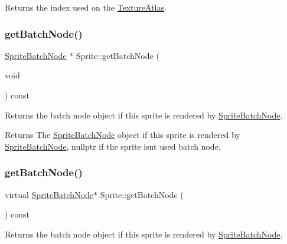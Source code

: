 Returns the index used on the \hyperlink{classTextureAtlas}{Texture\+Atlas}. \mbox{\label{classSprite_a1eb6a1e8196f526077a4435fee295e53}} 
\subsubsection{\texorpdfstring{get\+Batch\+Node()}{getBatchNode()}\hspace{0.1cm}{\footnotesize\ttfamily [1/2]}}
{\footnotesize\ttfamily \hyperlink{classSpriteBatchNode}{Sprite\+Batch\+Node} $\ast$ Sprite\+::get\+Batch\+Node (\begin{DoxyParamCaption}\item[{void}]{ }\end{DoxyParamCaption}) const\hspace{0.3cm}{\ttfamily [virtual]}}

Returns the batch node object if this sprite is rendered by \hyperlink{classSpriteBatchNode}{Sprite\+Batch\+Node}.

\begin{DoxyReturn}{Returns}
The \hyperlink{classSpriteBatchNode}{Sprite\+Batch\+Node} object if this sprite is rendered by \hyperlink{classSpriteBatchNode}{Sprite\+Batch\+Node}, nullptr if the sprite isn\textquotesingle{}t used batch node. 
\end{DoxyReturn}
\mbox{\label{classSprite_a5fde60267e49045cb867de2acae92ddf}} 
\subsubsection{\texorpdfstring{get\+Batch\+Node()}{getBatchNode()}\hspace{0.1cm}{\footnotesize\ttfamily [2/2]}}
{\footnotesize\ttfamily virtual \hyperlink{classSpriteBatchNode}{Sprite\+Batch\+Node}$\ast$ Sprite\+::get\+Batch\+Node (\begin{DoxyParamCaption}{ }\end{DoxyParamCaption}) const\hspace{0.3cm}{\ttfamily [virtual]}}

Returns the batch node object if this sprite is rendered by \hyperlink{classSpriteBatchNode}{Sprite\+Batch\+Node}.

